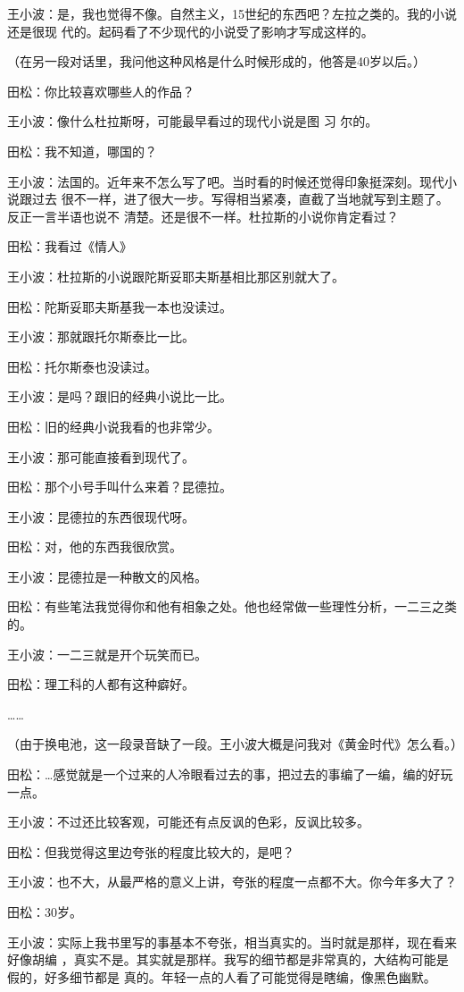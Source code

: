 王小波：是，我也觉得不像。自然主义，15世纪的东西吧？左拉之类的。我的小说还是很现
代的。起码看了不少现代的小说受了影响才写成这样的。


（在另一段对话里，我问他这种风格是什么时候形成的，他答是40岁以后。）


田松：你比较喜欢哪些人的作品？


王小波：像什么杜拉斯呀，可能最早看过的现代小说是图 习 尔的。


田松：我不知道，哪国的？


王小波：法国的。近年来不怎么写了吧。当时看的时候还觉得印象挺深刻。现代小说跟过去
很不一样，进了很大一步。写得相当紧凑，直截了当地就写到主题了。反正一言半语也说不
清楚。还是很不一样。杜拉斯的小说你肯定看过？


田松：我看过《情人》


王小波：杜拉斯的小说跟陀斯妥耶夫斯基相比那区别就大了。


田松：陀斯妥耶夫斯基我一本也没读过。


王小波：那就跟托尔斯泰比一比。


田松：托尔斯泰也没读过。


王小波：是吗？跟旧的经典小说比一比。


田松：旧的经典小说我看的也非常少。


王小波：那可能直接看到现代了。


田松：那个小号手叫什么来着？昆德拉。


王小波：昆德拉的东西很现代呀。


田松：对，他的东西我很欣赏。


王小波：昆德拉是一种散文的风格。


田松：有些笔法我觉得你和他有相象之处。他也经常做一些理性分析，一二三之类的。


王小波：一二三就是开个玩笑而已。


田松：理工科的人都有这种癖好。


……


（由于换电池，这一段录音缺了一段。王小波大概是问我对《黄金时代》怎么看。）


田松：…感觉就是一个过来的人冷眼看过去的事，把过去的事编了一编，编的好玩一点。


王小波：不过还比较客观，可能还有点反讽的色彩，反讽比较多。


田松：但我觉得这里边夸张的程度比较大的，是吧？


王小波：也不大，从最严格的意义上讲，夸张的程度一点都不大。你今年多大了？


田松：30岁。


王小波：实际上我书里写的事基本不夸张，相当真实的。当时就是那样，现在看来好像胡编
，真实不是。其实就是那样。我写的细节都是非常真的，大结构可能是假的，好多细节都是
真的。年轻一点的人看了可能觉得是瞎编，像黑色幽默。


